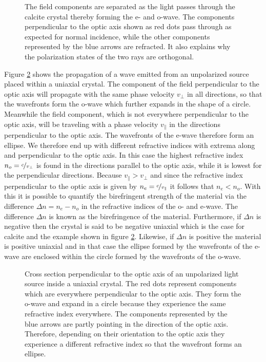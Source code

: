 \begin{figure}[h]
    \centering
    
    \caption{The field components are separated as the light passes through the calcite crystal thereby forming the e- and o-wave. The components perpendicular to the optic axis shown as red dots pass through as expected for normal incidence, while the other components represented by the blue arrows are refracted. It also explains why the polarization states of the two rays are orthogonal.}
    \label{fig:calcite_beams}
\end{figure}

Figure \ref{fig:uniaxial_source} shows the propagation of a wave emitted from an unpolarized source placed within a uniaxial crystal. The component of the field perpendicular to the optic axis will propagate with the same phase velocity $v_{\bot}$ in all directions, so that the wavefronts form the o-wave which further expands in the shape of a circle. Meanwhile the field component, which is not everywhere perpendicular to the optic axis, will be traveling with a phase velocity $v_{\parallel}$ in the directions perpendicular to the optic axis. The wavefronts of the e-wave therefore form an ellipse. We therefore end up with different refractive indices with extrema along and perpendicular to the optic axis. In this case the highest refractive index $n_o = \nicefrac{c}{v_{\bot}}$ is found in the directions parallel to the optic axis, while it is lowest for the perpendicular directions. Because $v_{\parallel} > v_{\bot}$ and since the refractive index perpendicular to the optic axis is given by $n_e = \nicefrac{c}{v_{\parallel}}$ it follows that $n_e < n_o$. With this it is possible to quantify the birefringent strength of the material via the difference $\Delta n = n_e - n_o$ in the refractive indices of the o- and e-wave. The difference $\Delta n$ is known as the birefringence of the material. Furthermore, if $\Delta n$ is negative then the crystal is said to be negative uniaxial which is the case for calcite and the example shown in figure \ref{fig:uniaxial_source}. Likewise, if $\Delta n$ is positive the material is positive uniaxial and in that case the ellipse formed by the wavefronts of the e-wave are enclosed within the circle formed by the wavefronts of the o-wave. 

\begin{figure}[h]
    \centering
    
    \caption{Cross section perpendicular to the optic axis of an unpolarized light source inside a uniaxial crystal. The red dots represent components which are everywhere perpendicular to the optic axis. They form the o-wave and expand in a circle because they experience the same refractive index everywhere. The components represented by the blue arrows are partly pointing in the direction of the optic axis. Therefore, depending on their orientation to the optic axis they experience a different refractive index so that the wavefront forms an ellipse.}
    \label{fig:uniaxial_source}
\end{figure}

